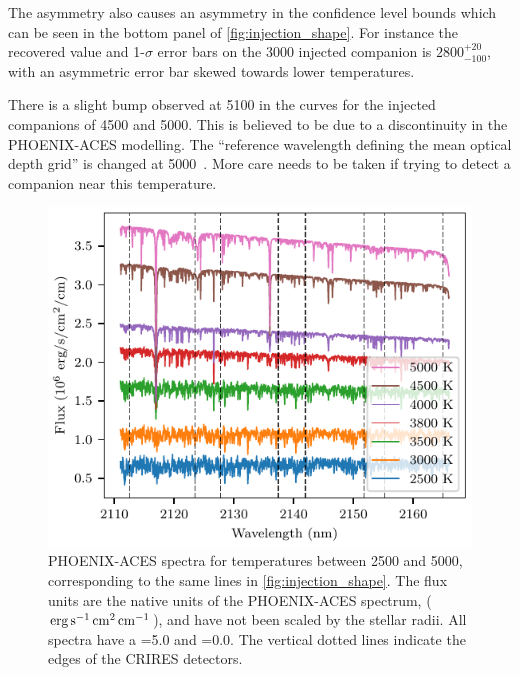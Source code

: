 The asymmetry also causes an asymmetry in the confidence level bounds which can be seen in the bottom panel of \cref{fig:injection_shape}.
For instance the recovered value and 1-\(\sigma\) error bars on the 3000\K{} injected companion is \(2800 ^{+20}_{-100}\), with an asymmetric error bar skewed towards lower temperatures.

There is a slight bump observed at 5100\K{} in the \textchisquared{} curves for the injected companions of 4500 and 5000\K{}.
This is believed to be due to a discontinuity in the {PHOENIX-ACES} modelling.
The ``reference wavelength defining the mean optical depth grid'' is changed at 5000\K{}~\citep[][Section~2.3]{husser_new_2013}.
More care needs to be taken if trying to detect a companion near this temperature.

\begin{figure}
    \centering
    \includegraphics[width=0.8\linewidth]{./figures/companion_recovery/companion_spectra.pdf}
    \caption{{PHOENIX-ACES} spectra for temperatures between 2500 and 5000\K{}, corresponding to the same lines in \cref{fig:injection_shape}.
        The flux units are the native units of the {PHOENIX-ACES} spectrum, (\(\rm erg\,s^{-1}\,cm^{2}\,cm^{-1}\)), and have not been scaled by the stellar radii.
        All spectra have a \Logg{}=5.0 and \feh{}=0.0.
        The vertical dotted lines indicate the edges of the CRIRES detectors.}
    \label{fig:comp_spectra}
\end{figure}

